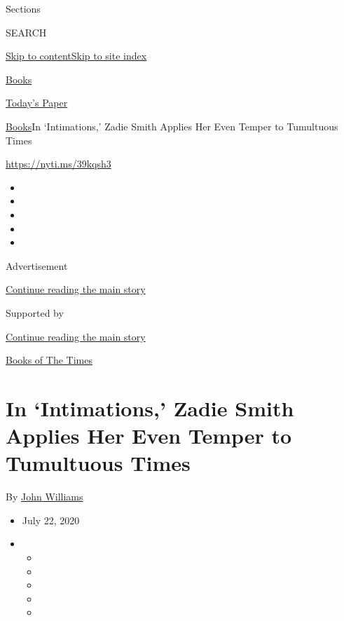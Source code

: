 Sections

SEARCH

\protect\hyperlink{site-content}{Skip to
content}\protect\hyperlink{site-index}{Skip to site index}

\href{https://www.nytimes.com/section/books}{Books}

\href{https://myaccount.nytimes.com/auth/login?response_type=cookie\&client_id=vi}{}

\href{https://www.nytimes.com/section/todayspaper}{Today's Paper}

\href{/section/books}{Books}\textbar{}In `Intimations,' Zadie Smith
Applies Her Even Temper to Tumultuous Times

\url{https://nyti.ms/39kqsh3}

\begin{itemize}
\item
\item
\item
\item
\item
\end{itemize}

Advertisement

\protect\hyperlink{after-top}{Continue reading the main story}

Supported by

\protect\hyperlink{after-sponsor}{Continue reading the main story}

\href{/column/books-of-the-times}{Books of The Times}

\hypertarget{in-intimations-zadie-smith-applies-her-even-temper-to-tumultuous-times}{%
\section{In `Intimations,' Zadie Smith Applies Her Even Temper to
Tumultuous
Times}\label{in-intimations-zadie-smith-applies-her-even-temper-to-tumultuous-times}}

By \href{https://www.nytimes.com/by/john-williams}{John Williams}

\begin{itemize}
\item
  July 22, 2020
\item
  \begin{itemize}
  \item
  \item
  \item
  \item
  \item
  \end{itemize}
\end{itemize}

